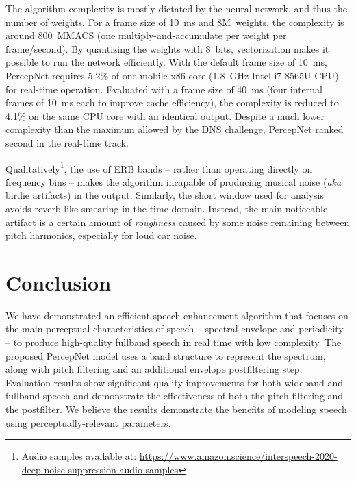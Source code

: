 \documentclass[english]{article}
\begin{document}
The algorithm complexity is mostly dictated by the neural network,
and thus the number of weights. For a frame size of 10~ms and 8M~weights,
the complexity is around 800~MMACS (one multiply-and-accumulate per
weight per frame/second). By quantizing the weights with 8~bits,
vectorization makes it possible to run the network efficiently. With
the default frame size of 10~ms, PercepNet requires 5.2\% of one
mobile x86 core (1.8~GHz Intel i7-8565U CPU) for real-time operation.
Evaluated with a frame size of 40~ms (four internal frames of 10~ms
each to improve cache efficiency), the complexity is reduced to 4.1\%
on the same CPU core with an identical output. Despite a much lower
complexity than the maximum allowed by the DNS challenge, PercepNet
ranked second in the real-time track.

Qualitatively\footnote{Audio samples available at: \href{https://www.amazon.science/interspeech-2020-deep-noise-suppression-audio-samples}{https://www.amazon.science/interspeech-2020-deep-noise-suppression-audio-samples}},
the use of ERB bands -- rather than operating directly on frequency
bins -- makes the algorithm incapable of producing musical noise (\emph{aka}
birdie artifacts) in the output. Similarly, the short window used
for analysis avoids reverb-like smearing in the time domain. Instead,
the main noticeable artifact is a certain amount of \emph{roughness}
caused by some noise remaining between pitch harmonics, especially
for loud car noise.


\section{Conclusion}

We have demonstrated an efficient speech enhancement algorithm that
focuses on the main perceptual characteristics of speech -- spectral
envelope and periodicity -- to produce high-quality fullband speech
in real time with low complexity. The proposed PercepNet model uses
a band structure to represent the spectrum, along with pitch filtering
and an additional envelope postfiltering step. Evaluation results
show significant quality improvements for both wideband and fullband
speech and demonstrate the effectiveness of both the pitch filtering
and the postfilter. We believe the results demonstrate the benefits
of modeling speech using perceptually-relevant parameters. 

\label{sec:conclusion}



\end{document}
